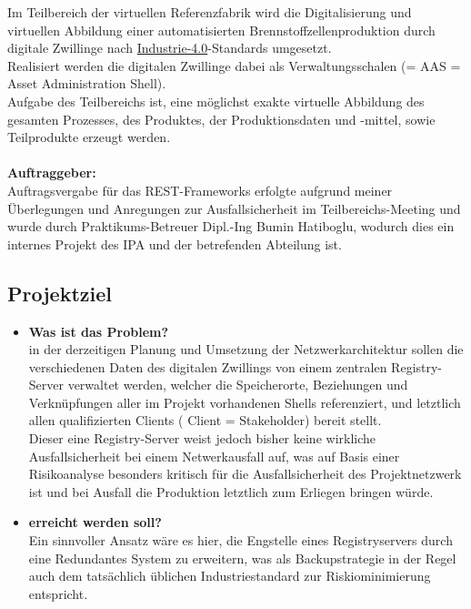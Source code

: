 Im Teilbereich der virtuellen Referenzfabrik wird die Digitalisierung und virtuellen Abbildung einer automatisierten Brennstoffzellenproduktion durch digitale Zwillinge nach \href{Navigation/DE/Home/home.html}{Industrie-4.0}-Standards umgesetzt.\\
Realisiert werden die digitalen Zwillinge dabei als Verwaltungsschalen (= AAS = Asset
Administration Shell).\\ 
 Aufgabe des Teilbereichs ist, eine möglichst exakte virtuelle Abbildung des gesamten Prozesses, des Produktes, der Produktionsdaten und -mittel, sowie Teilprodukte erzeugt werden.\\
 \\
\textbf{Auftraggeber:} \\
Auftragsvergabe für das REST-Frameworks erfolgte aufgrund meiner Überlegungen und Anregungen zur Ausfallsicherheit im Teilbereichs-Meeting und wurde durch Praktikums-Betreuer Dipl.-Ing Bumin Hatiboglu, wodurch dies ein internes Projekt des IPA und der betrefenden Abteilung ist.



\subsection{Projektziel} 
\label{sec:Projektziel}
\begin{itemize}
	\item \textbf{Was ist das Problem?}\\
    in der derzeitigen Planung und Umsetzung der Netzwerkarchitektur sollen die verschiedenen Daten des digitalen Zwillings von einem zentralen Registry-Server verwaltet werden, welcher die Speicherorte, Beziehungen und Verknüpfungen aller im Projekt vorhandenen Shells referenziert, und letztlich allen qualifizierten Clients ( Client = Stakeholder) bereit stellt.\\
    Dieser eine Registry-Server weist jedoch bisher keine wirkliche Ausfallsicherheit bei einem Netwerkausfall auf, was auf Basis einer Risikoanalyse besonders kritisch für die Ausfallsicherheit des Projektnetzwerk ist und bei Ausfall die Produktion letztlich zum Erliegen bringen würde.
	\item \textbf{erreicht werden soll?}\\
    Ein sinnvoller Ansatz wäre es hier, die Engstelle eines Registryservers durch eine Redundantes System zu erweitern, was als Backupstrategie in der Regel  auch dem tatsächlich üblichen Industriestandard zur Riskiominimierung entspricht.  
    
\end{itemize}



